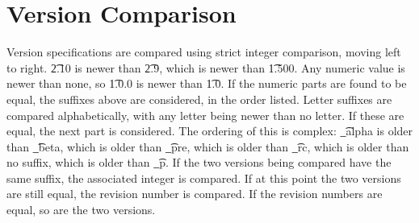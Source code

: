 \section{Version Comparison}
Version specifications are compared using strict integer comparison, moving left to right. \t{2.10}
is newer than \t{2.9}, which is newer than \t{1.500}. Any numeric value is newer than none, so
\t{1.0.0} is newer than \t{1.0}. If the numeric parts are found to be equal, the
suffixes above are considered, in the order listed. Letter suffixes are compared alphabetically,
with any letter being newer than no letter. If these are equal, the next part is considered. The
ordering of this is complex: \t{\_alpha} is older than \t{\_beta}, which is older than \t{\_pre},
which is older than \t{\_rc}, which is older than no suffix, which is older than \t{\_p}. If the two
versions being compared have the same suffix, the associated integer is compared. If at this point
the two versions are still equal, the revision number is compared. If the revision numbers are
equal, so are the two versions.

